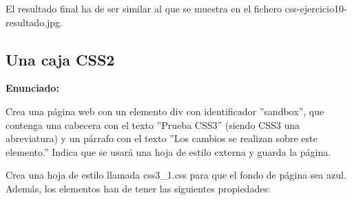 El resultado final ha de ser similar al que se muestra en el fichero css-ejercicio10-resultado.jpg.

\subsection{Una caja CSS2}
\label{subsec:caja-css2}

\textbf{Enunciado:}

Crea una página web con un elemento div con identificador ''sandbox'', que contenga una cabecera con el texto ''Prueba CSS3'' (siendo CSS3 una abreviatura) y un párrafo con el texto ''Los cambios se realizan sobre este elemento.'' Indica que se usará una hoja de estilo externa y guarda la página.

Crea una hoja de estilo llamada css3\_1.css para que el fondo de página sea azul. Además, los elementos han de tener las siguientes propiedades:

